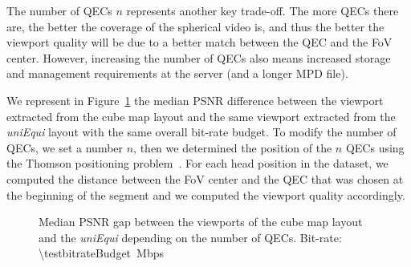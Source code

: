 The number of \acp{QEC} $n$ represents another key trade-off. The more
\acp{QEC} there are, the better the coverage of the spherical video
is, and thus the better the viewport quality will be due to a better
match between the \ac{QEC} and the \ac{FoV} center. However,
increasing the number of \acp{QEC} also means increased storage and
management requirements at the server (and a longer \ac{MPD} file).


We represent in Figure~\ref{fig:QEC} the median \ac{PSNR} difference
between the viewport extracted from the cube map layout and the
same viewport extracted from the \emph{uniEqui} layout with the same
overall bit-rate budget. To modify the number of \acp{QEC}, we set a
number $n$, then we determined the position of the $n$ \acp{QEC}
using the Thomson positioning problem~\cite{rakhmanov1994electrons}.
For each head position in the dataset, we computed the distance
between the \ac{FoV} center and the \ac{QEC} that was chosen at the
beginning of the segment and we computed the viewport quality
accordingly.
%
%


\begin{figure}
\centering

\caption{Median \acs{PSNR} gap between the viewports of the cube map layout and the \textit{uniEqui} depending
on the number of QECs.
Bit-rate: \SI{\testbitrateBudget}{\mega bps}}
\label{fig:QEC}
\end{figure}

